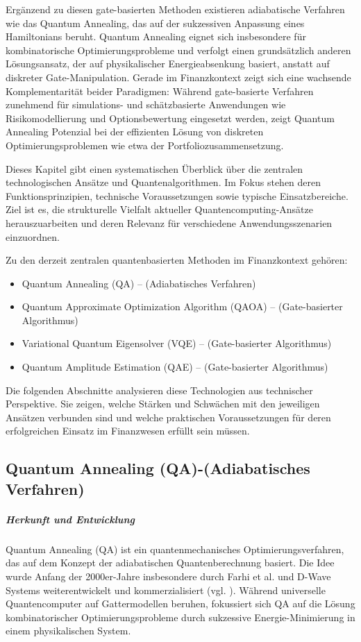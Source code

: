 Ergänzend zu diesen gate-basierten Methoden existieren adiabatische Verfahren wie das Quantum Annealing, das auf der sukzessiven Anpassung eines Hamiltonians beruht. Quantum Annealing eignet sich insbesondere für kombinatorische Optimierungsprobleme und verfolgt einen grundsätzlich anderen Lösungsansatz, der auf physikalischer Energieabsenkung basiert, anstatt auf diskreter Gate-Manipulation. Gerade im Finanzkontext zeigt sich eine wachsende Komplementarität beider Paradigmen: Während gate-basierte Verfahren zunehmend für simulations- und schätzbasierte Anwendungen wie Risikomodellierung und Optionsbewertung eingesetzt werden, zeigt Quantum Annealing Potenzial bei der effizienten Lösung von diskreten Optimierungsproblemen wie etwa der Portfoliozusammensetzung.

Dieses Kapitel gibt einen systematischen Überblick über die zentralen technologischen Ansätze und Quantenalgorithmen. Im Fokus stehen deren Funktionsprinzipien, technische Voraussetzungen sowie typische Einsatzbereiche. Ziel ist es, die strukturelle Vielfalt aktueller Quantencomputing-Ansätze herauszuarbeiten und deren Relevanz für verschiedene Anwendungsszenarien einzuordnen.

Zu den derzeit zentralen quantenbasierten Methoden im Finanzkontext gehören:

\begin{itemize}
\item Quantum Annealing (QA) – (Adiabatisches Verfahren)
\item Quantum Approximate Optimization Algorithm (QAOA) – (Gate-basierter Algorithmus)
\item Variational Quantum Eigensolver (VQE) – (Gate-basierter Algorithmus)
\item Quantum Amplitude Estimation (QAE) – (Gate-basierter Algorithmus)
\end{itemize}

Die folgenden Abschnitte analysieren diese Technologien aus technischer Perspektive. Sie zeigen, welche Stärken und Schwächen mit den jeweiligen Ansätzen verbunden sind und welche praktischen Voraussetzungen für deren erfolgreichen Einsatz im Finanzwesen erfüllt sein müssen.

\subsection{Quantum Annealing (QA)-(Adiabatisches Verfahren)}

\subparagraph{Herkunft und Entwicklung}
Quantum Annealing (QA) ist ein quantenmechanisches Optimierungsverfahren, das auf dem Konzept der adiabatischen Quantenberechnung basiert. Die Idee wurde Anfang der 2000er-Jahre insbesondere durch Farhi et al. und D-Wave Systems weiterentwickelt und kommerzialisiert (vgl. \cite{orus_quantum_2019}). Während universelle Quantencomputer auf Gattermodellen beruhen, fokussiert sich QA auf die Lösung kombinatorischer Optimierungsprobleme durch sukzessive Energie-Minimierung in einem physikalischen System.

